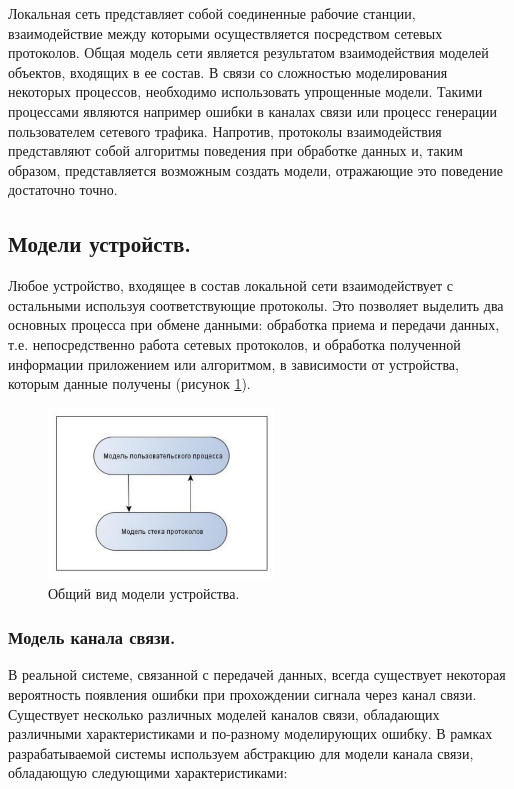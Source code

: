 \documentclass[12pt]{report}
\begin{document}
    Локальная сеть представляет собой соединенные рабочие станции, взаимодействие между которыми осуществляется посредством сетевых протоколов. Общая модель сети является результатом взаимодействия моделей объектов, входящих в ее состав. В связи со сложностью моделирования некоторых процессов, необходимо использовать упрощенные модели. Такими процессами являются например ошибки в каналах связи или процесс генерации пользователем сетевого трафика. Напротив, протоколы взаимодействия представляют собой алгоритмы поведения при обработке данных и, таким образом, представляется возможным создать модели, отражающие это поведение достаточно точно.

    \subsection{Модели устройств.}

    Любое устройство, входящее в состав локальной сети взаимодействует с остальными используя соответствующие протоколы. Это позволяет выделить два основных процесса при обмене данными: обработка приема и передачи данных, т.е. непосредственно работа сетевых протоколов, и обработка полученной информации приложением или алгоритмом, в зависимости от устройства, которым данные получены (рисунок \ref{Pic5}).

    \begin{figure}\center
        \includegraphics[width = 60mm]{Ch2Pic5}
        \caption{Общий вид модели устройства.} \label{Pic5}
    \end{figure}

    \subsubsection{Модель канала связи. }

    В реальной системе, связанной с передачей данных, всегда существует некоторая вероятность появления ошибки при прохождении сигнала через канал связи. Существует несколько различных моделей каналов связи, обладающих различными характеристиками и по-разному моделирующих ошибку. В рамках разрабатываемой системы используем абстракцию для модели канала связи, обладающую следующими характеристиками:
\end{document}
